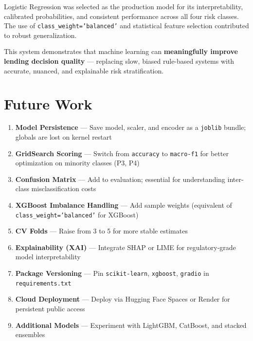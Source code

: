 \documentclass[12pt,a4paper]{article}
\begin{document}
Logistic Regression was selected as the production model for its interpretability,
calibrated probabilities, and consistent performance across all four risk classes.
The use of \texttt{class\_weight='balanced'} and statistical feature selection
contributed to robust generalization.

This system demonstrates that machine learning can \textbf{meaningfully improve
lending decision quality} --- replacing slow, biased rule-based systems with
accurate, nuanced, and explainable risk stratification.

\newpage

\section{Future Work}

\begin{tcolorbox}[
  enhanced, colback=warningbg, colframe=highlight, arc=5pt,
  title={\faForward\quad Recommended Improvements},
  fonttitle=\bfseries\small\color{white},
  attach boxed title to top left={yshift=-2mm, xshift=4mm},
  boxed title style={colback=highlight},
  left=6pt, right=6pt, top=10pt, bottom=6pt,
]
\begin{enumerate}
  \item \textbf{Model Persistence} --- Save model, scaler, and encoder
        as a \texttt{joblib} bundle; globals are lost on kernel restart

  \item \textbf{GridSearch Scoring} --- Switch from \texttt{accuracy}
        to \texttt{macro-f1} for better optimization on minority classes (P3, P4)

  \item \textbf{Confusion Matrix} --- Add to evaluation; essential for
        understanding inter-class misclassification costs

  \item \textbf{XGBoost Imbalance Handling} --- Add sample weights
        (equivalent of \texttt{class\_weight='balanced'} for XGBoost)

  \item \textbf{CV Folds} --- Raise from 3 to 5 for more stable estimates

  \item \textbf{Explainability (XAI)} --- Integrate SHAP or LIME for
        regulatory-grade model interpretability

  \item \textbf{Package Versioning} --- Pin \texttt{scikit-learn},
        \texttt{xgboost}, \texttt{gradio} in \texttt{requirements.txt}

  \item \textbf{Cloud Deployment} --- Deploy via Hugging Face Spaces
        or Render for persistent public access

  \item \textbf{Additional Models} --- Experiment with LightGBM,
        CatBoost, and stacked ensembles
\end{enumerate}
\end{tcolorbox}
\end{document}
